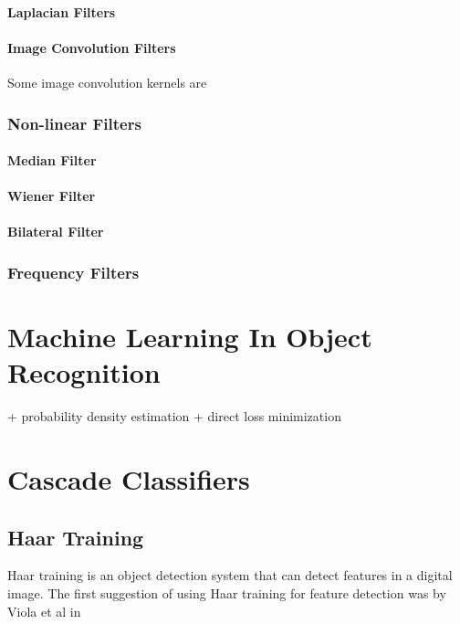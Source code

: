 \documentclass[12pt,a4paper,oneside,pdftex]{report}
\begin{document}
\subsubsection{Laplacian Filters}


\subsubsection{Image Convolution Filters}

Some image convolution kernels are 

\subsection{Non-linear Filters}

\subsubsection{Median Filter}

\subsubsection{Wiener Filter}

\subsubsection{Bilateral Filter}

\subsection{Frequency Filters}

\chapter{Machine Learning In Object Recognition}

+ probability density estimation
+ direct loss minimization


\chapter{Cascade Classifiers}
\section{Haar Training}

Haar training is an object detection system that can detect features in a digital image. The first suggestion of using Haar training for feature detection was by Viola et al in 
\end{document}
